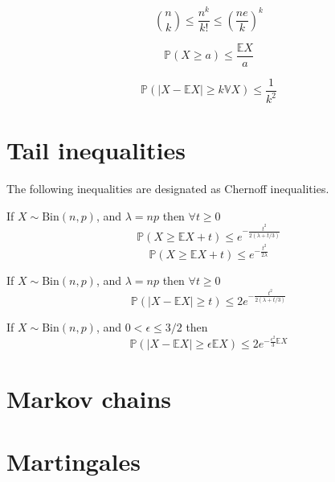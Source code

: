 \begin{corollary}
	\begin{equation}
		\binom{n}{k} \leq \frac{n^k}{k!} \leq (\frac{ne}{k})^k
	\end{equation}
\end{corollary}

\begin{theorem}\label{markov}
	\begin{equation}
		\mathbb{P}(X \geq a) \leq \frac{\mathbb{E}X}{a}
	\end{equation}
\end{theorem}
\begin{corollary}\label{cheby}
	\begin{equation}
		\mathbb{P}(|X - \mathbb{E}X| \geq k \mathbb{V}X ) \leq \frac{1}{k^2}
	\end{equation}
\end{corollary}

\section{Tail inequalities}
The following inequalities are designated as Chernoff inequalities.
\begin{theorem}\label{chernoff1}
	If $X \sim \text{Bin}(n, p)$, and $\lambda = np$ then $\forall t \geq 0$
	\begin{equation}
		\mathbb{P}( X \geq \mathbb{E}X + t) \leq e^{-\frac{t^2}{2(\lambda + t/3)}}
	\end{equation}
	\begin{equation}
		\mathbb{P}( X \geq \mathbb{E}X + t) \leq e^{-\frac{t^2}{2\lambda}}
	\end{equation}
\end{theorem}
\begin{corollary}\label{chernoff2}
	If $X \sim \text{Bin}(n, p)$, and $\lambda = np$ then $\forall t \geq 0$
	\begin{equation}
		\mathbb{P}( |X - \mathbb{E}X| \geq t) \leq 2e^{-\frac{t^2}{2(\lambda + t/3)}}
	\end{equation}
\end{corollary}
\begin{corollary}\label{chernoff3}
	If $X \sim \text{Bin}(n, p)$, and $0<\epsilon \leq 3/2$ then
	\begin{equation}
		\mathbb{P}( |X - \mathbb{E}X| \geq \epsilon \mathbb{E}X) \leq 2e^{-\frac{\epsilon^2}{3}\mathbb{E}X }
	\end{equation}
\end{corollary}
\begin{theorem}\label{binomTail}

\end{theorem}

\section{Markov chains}
\section{Martingales}

